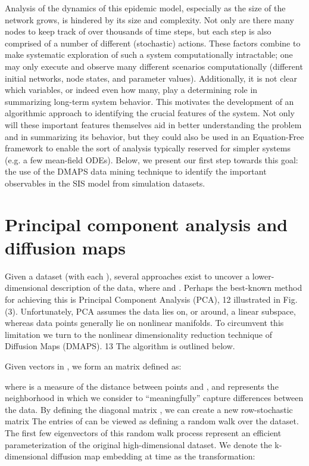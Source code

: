 Analysis of the dynamics of this epidemic model, especially as the
size of the network grows, is hindered by its size and complexity. Not
only are there many nodes to keep track of over thousands of time
steps, but each step is also comprised of a number of different
(stochastic) actions. These factors combine to make systematic
exploration of such a system computationally intractable; one may only
execute and observe many different scenarios computationally
(different initial networks, node states, and parameter
values). Additionally, it is not clear which variables, or indeed even
how many, play a determining role in summarizing long-term system
behavior. This motivates the development of an algorithmic approach to
identifying the crucial features of the system. Not only will these
important features themselves aid in better understanding the problem
and in summarizing its behavior, but they could also be used in an
Equation-Free framework to enable the sort of analysis typically
reserved for simpler systems (e.g. a few mean-field ODEs). Below, we
present our first step towards this goal: the use of the DMAPS data
mining technique to identify the important observables in the SIS
model from simulation datasets.

\section{Principal component analysis and diffusion maps}

Given a dataset (with each ), several approaches exist to uncover a
lower-dimensional description of the data, where and . Perhaps the
best-known method for achieving this is Principal Component Analysis
(PCA), 12 illustrated in Fig. (3). Unfortunately, PCA assumes the data
lies on, or around, a linear subspace, whereas data points generally
lie on nonlinear manifolds. To circumvent this limitation we turn to
the nonlinear dimensionality reduction technique of Diffusion Maps
(DMAPS). 13 The algorithm is outlined below.

Given vectors in , we form an matrix defined as:

where is a measure of the distance between points and , and represents
the neighborhood in which we consider to “meaningfully” capture
differences between the data. By defining the diagonal matrix , we can
create a new row-stochastic matrix The entries of can be viewed as
defining a random walk over the dataset. The first few eigenvectors of
this random walk process represent an efficient parameterization of
the original high-dimensional dataset. We denote the k-dimensional
diffusion map embedding at time as the transformation:

